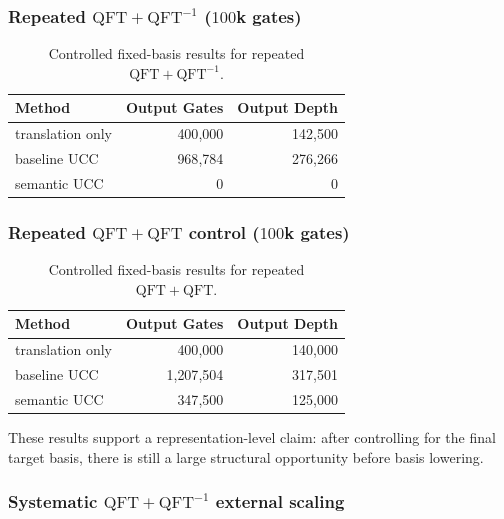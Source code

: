 \documentclass[11pt]{article}
\begin{document}
\subsubsection{\texorpdfstring{Repeated $\mathrm{QFT}+\mathrm{QFT}^{-1}$ ($100$k gates)}{Repeated QFT+inverse-QFT (100k gates)}}

\begin{table}[h]
\centering
\begin{tabular}{lrr}
\toprule
Method & Output Gates & Output Depth \\
\midrule
translation only & 400{,}000 & 142{,}500 \\
baseline UCC & 968{,}784 & 276{,}266 \\
semantic UCC & 0 & 0 \\
\bottomrule
\end{tabular}
\caption{Controlled fixed-basis results for repeated $\mathrm{QFT}+\mathrm{QFT}^{-1}$.}
\label{tab:qft-inverse-fixed}
\end{table}

\subsubsection{\texorpdfstring{Repeated $\mathrm{QFT}+\mathrm{QFT}$ control ($100$k gates)}{Repeated QFT+QFT control (100k gates)}}

\begin{table}[h]
\centering
\begin{tabular}{lrr}
\toprule
Method & Output Gates & Output Depth \\
\midrule
translation only & 400{,}000 & 140{,}000 \\
baseline UCC & 1{,}207{,}504 & 317{,}501 \\
semantic UCC & 347{,}500 & 125{,}000 \\
\bottomrule
\end{tabular}
\caption{Controlled fixed-basis results for repeated $\mathrm{QFT}+\mathrm{QFT}$.}
\label{tab:qft-control-fixed}
\end{table}

These results support a representation-level claim: after controlling for the
final target basis, there is still a large structural opportunity before basis
lowering.

\subsubsection{Systematic \texorpdfstring{$\mathrm{QFT}+\mathrm{QFT}^{-1}$}{QFT+inverse-QFT} external scaling}
\end{document}
